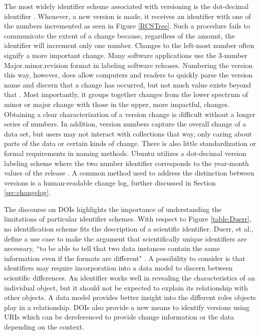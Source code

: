 The most widely identifier scheme associated with versioning is the dot-decimal identifier \cite{Stuckenholz:2005:CEV:1039174.1039197}.
Whenever, a new version is made, it receives an identifier with one of the numbers incremented as seen in Figure \ref{RCSTree}.
Such a procedure fails to communicate the extent of a change because, regardless of the amount, the identifier will increment only one number.
Changes to the left-most number often signify a more important change.
Many software applications use the 3-number Major.minor.revision format in labeling software releases.
Numbering the version this way, however, does allow computers and readers to quickly parse the version name and discern that a change has occurred, but not much value exists beyond that \cite{Dijkstra1994}.
Most importantly, it groups together changes from the lower spectrum of minor or major change with those in the upper, more impactful, changes.
Obtaining a clear characterization of a version change is difficult without a longer series of numbers.
In addition, version numbers capture the overall change of a data set, but users may not interact with collections that way, only caring about parts of the data or certain kinds of change.
There is also little standardization or formal requirements in naming methods.
Ubuntu utilizes a dot-decimal version labeling scheme where the two number identifier corresponds to the year-month values of the release \cite{Ubuntu}.
A common method used to address the distinction between versions is a human-readable change log, further discussed in Section \ref{sec:changelog}.

The discourse on DOIs highlights the importance of understanding the limitations of particular identifier schemes.
With respect to Figure \ref{table:Duerr}, no identification scheme fits the description of a scientific identifier.
Duerr, et al., define a use case to make the argument that scientifically unique identifiers are necessary, ``to be able to tell that two data instances contain the same information even if the formats are different" \cite{Duerr2011}.
A possibility to consider is that identifiers may require incorporation into a data model to discern between scientific differences.
An identifier works well in revealing the characteristics of an individual object, but it should not be expected to explain its relationship with other objects.
A data model provides better insight into the different roles objects play in a relationship.
DOIs also provide a new means to identify versions using URIs which can be dereferenced to provide change information or the data depending on the context.

